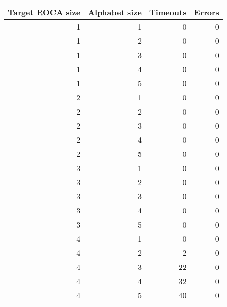 \begin{tabular}{rrrr}
\toprule
 Target ROCA size &  Alphabet size &  Timeouts &  Errors \\
\midrule
                1 &              1 &         0 &       0 \\
                1 &              2 &         0 &       0 \\
                1 &              3 &         0 &       0 \\
                1 &              4 &         0 &       0 \\
                1 &              5 &         0 &       0 \\
                2 &              1 &         0 &       0 \\
                2 &              2 &         0 &       0 \\
                2 &              3 &         0 &       0 \\
                2 &              4 &         0 &       0 \\
                2 &              5 &         0 &       0 \\
                3 &              1 &         0 &       0 \\
                3 &              2 &         0 &       0 \\
                3 &              3 &         0 &       0 \\
                3 &              4 &         0 &       0 \\
                3 &              5 &         0 &       0 \\
                4 &              1 &         0 &       0 \\
                4 &              2 &         2 &       0 \\
                4 &              3 &        22 &       0 \\
                4 &              4 &        32 &       0 \\
                4 &              5 &        40 &       0 \\
\bottomrule
\end{tabular}
